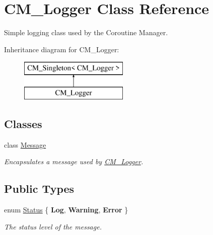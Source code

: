 \hypertarget{class_c_m___logger}{}\section{C\+M\+\_\+\+Logger Class Reference}
\label{class_c_m___logger}


Simple logging class used by the Coroutine Manager.  


Inheritance diagram for C\+M\+\_\+\+Logger\+:\begin{figure}[H]
\begin{center}
\leavevmode
\includegraphics[height=2.000000cm]{class_c_m___logger}
\end{center}
\end{figure}
\subsection*{Classes}
\begin{DoxyCompactItemize}
\item 
class \hyperlink{class_c_m___logger_1_1_message}{Message}
\begin{DoxyCompactList}\small\item\em Encapsulates a message used by \hyperlink{class_c_m___logger}{C\+M\+\_\+\+Logger}. \end{DoxyCompactList}\end{DoxyCompactItemize}
\subsection*{Public Types}
\begin{DoxyCompactItemize}
\item 
enum \hyperlink{class_c_m___logger_ac2e71ba1ec4f24a09693eeae7b77611c}{Status} \{ {\bfseries Log}, 
{\bfseries Warning}, 
{\bfseries Error}
 \}\begin{DoxyCompactList}\small\item\em The status level of the message. \end{DoxyCompactList}
\end{DoxyCompactItemize}
